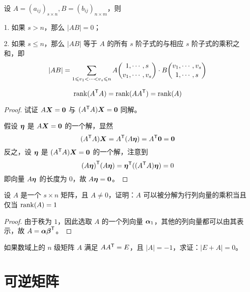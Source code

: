 \begin{theorem}
	设 $A = (a_{ij})_{s \times n},B = (b_{ij})_{n \times m}$，则
	
	1. 如果 $s>n$，那么 $|AB| = 0$；
	
	2. 如果 $s\leqslant n$，那么  $|AB|$ 等于 $A$ 的所有 $s$ 阶子式的与相应 $s$ 阶子式的乘积之和，即
	\[|AB|=\sum_{1 \leqslant v_1<\cdots< v_s \leqslant n}A \dbinom{1,\cdots,s}{v_1,\cdots,v_s} \cdot B \dbinom{v_1,\cdots,v_s}{1,\cdots,s}\]
\end{theorem}

\begin{theorem}
	\[ \operatorname{rank}({A}^\mathsf{T}A) = \operatorname{rank}(A {A}^\mathsf{T}) = \operatorname{rank}(A) \]
\end{theorem}

\begin{proof}
	试证 $A\boldsymbol{X} = \boldsymbol{0}$ 与 $({A}^\mathsf{T}A) \boldsymbol{X} = \boldsymbol{0}$ 同解。
	
	假设 $\boldsymbol{\eta}$ 是 $A \boldsymbol{X} = \boldsymbol{0}$ 的一个解，显然
	\[ ({A}^\mathsf{T}A) \boldsymbol{X} = {A}^\mathsf{T} (A \boldsymbol{\eta}) = {A}^\mathsf{T} \boldsymbol{0} = \boldsymbol{0} \]
	反之，设 $\boldsymbol{\eta}$ 是 $({A}^\mathsf{T}A) \boldsymbol{X} = \boldsymbol{0}$ 的一个解，注意到
	\[ {(A \boldsymbol{\eta})}^\mathsf{T}(A \boldsymbol{\eta}) = {\boldsymbol{\eta}}^\mathsf{T} (({A}^\mathsf{T}A) \boldsymbol{\eta}) = 0 \]
	即向量 $A \boldsymbol{\eta}$ 的长度为 $0$，故 $A \boldsymbol{\eta} = \boldsymbol{0}$。
\end{proof}

\begin{theorem}
	设 $A$ 是一个 $s \times n$ 矩阵，且 $A \neq 0$，证明：$A$ 可以被分解为行列向量的乘积当且仅当 $\operatorname{rank}(A) = 1$
\end{theorem}

\begin{proof}
	由于秩为 $1$，因此选取 $A$ 的一个列向量 $\boldsymbol{\alpha}_1$，其他的列向量都可以由其表示，故 $A = \boldsymbol{\alpha} {\boldsymbol{\beta}}^\mathsf{T}$。
\end{proof}

\begin{example}
	如果数域上的 $n$ 级矩阵 $A$ 满足 $A {A}^\mathsf{T} = E$，且 $|A| = -1$，求证：$|E+A| = 0$。
\end{example}

\begin{solution}

\end{solution}

\section{可逆矩阵}


